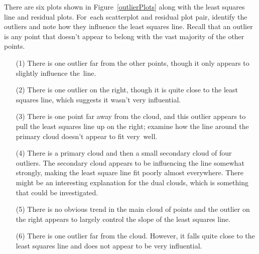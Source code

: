 \begin{examplewrap}
\begin{nexample}{There are six plots shown in
    Figure~\ref{outlierPlots} along with the least squares
    line and residual plots.
    For~each scatterplot and residual plot pair,
    identify the outliers and note how they influence
    the least squares line.
    Recall that an outlier is any point that doesn't appear
    to belong with the vast majority of the other points.}
  \label{outlierPlotsExample}%
  \begin{itemize}
  \item[(1)]
      There is one outlier far from the other points,
      though it only appears to slightly influence the~line.
  \item[(2)]
      There is one outlier on the right, though it is quite
      close to the least squares line, which suggests it
      wasn't very influential.
  \item[(3)]
      There is one point far away from the cloud, and this
      outlier appears to pull the least squares line up on
      the right;
      examine how the line around the primary cloud doesn't
      appear to fit very~well.
  \item[(4)]
      There is a primary cloud and then a small secondary
      cloud of four outliers.
      The secondary cloud appears to be influencing the line
      somewhat strongly, making the least square line fit
      poorly almost everywhere.
      There might be an interesting explanation for the dual
      clouds, which is something that could be investigated.
  \item[(5)]
      There is no obvious trend in the main cloud of points
      and the outlier on the right appears to largely control
      the slope of the least squares line.
  \item[(6)]
      There is one outlier far from the cloud.
      However, it falls quite close to the least squares line
      and does not appear to be very influential.
  \end{itemize}
\end{nexample}
\end{examplewrap}

